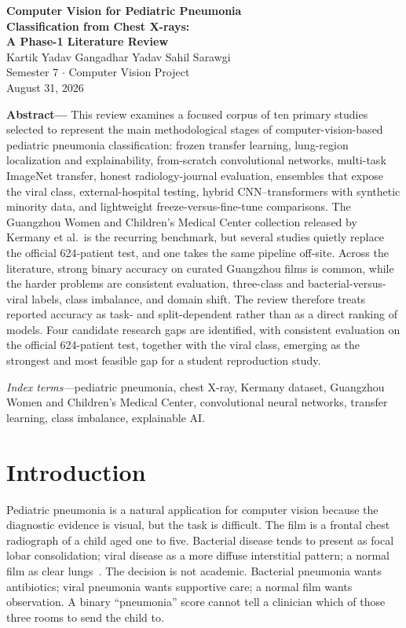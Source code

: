 \documentclass[11pt,a4paper]{article}
\begin{document}
\begin{center}
{\LARGE\bfseries Computer Vision for Pediatric Pneumonia\\[0.25em]
Classification from Chest X-rays:\\[0.35em]
A Phase-1 Literature Review}\\[1.1em]
Kartik Yadav \quad Gangadhar Yadav \quad Sahil Sarawgi\\[0.4em]
{\small Semester 7 $\cdot$ Computer Vision Project}\\[0.15em]
{\small August 31, 2026}
\end{center}

\vspace{0.6em}
\noindent\textbf{Abstract---}
This review examines a focused corpus of ten primary studies selected to represent the main methodological stages of computer-vision-based pediatric pneumonia classification: frozen transfer learning, lung-region localization and explainability, from-scratch convolutional networks, multi-task ImageNet transfer, honest radiology-journal evaluation, ensembles that expose the viral class, external-hospital testing, hybrid CNN--transformers with synthetic minority data, and lightweight freeze-versus-fine-tune comparisons. The Guangzhou Women and Children's Medical Center collection released by Kermany et al.\ is the recurring benchmark, but several studies quietly replace the official 624-patient test, and one takes the same pipeline off-site. Across the literature, strong binary accuracy on curated Guangzhou films is common, while the harder problems are consistent evaluation, three-class and bacterial-versus-viral labels, class imbalance, and domain shift. The review therefore treats reported accuracy as task- and split-dependent rather than as a direct ranking of models. Four candidate research gaps are identified, with consistent evaluation on the official 624-patient test, together with the viral class, emerging as the strongest and most feasible gap for a student reproduction study.

\vspace{0.4em}
\noindent\textit{Index terms---}pediatric pneumonia, chest X-ray, Kermany dataset, Guangzhou Women and Children's Medical Center, convolutional neural networks, transfer learning, class imbalance, explainable AI.

\tableofcontents
\newpage

\section{Introduction}
Pediatric pneumonia is a natural application for computer vision because the diagnostic evidence is visual, but the task is difficult. The film is a frontal chest radiograph of a child aged one to five. Bacterial disease tends to present as focal lobar consolidation; viral disease as a more diffuse interstitial pattern; a normal film as clear lungs~\cite{kermany2018}. The decision is not academic. Bacterial pneumonia wants antibiotics; viral pneumonia wants supportive care; a normal film wants observation. A binary ``pneumonia'' score cannot tell a clinician which of those three rooms to send the child to.
\end{document}
